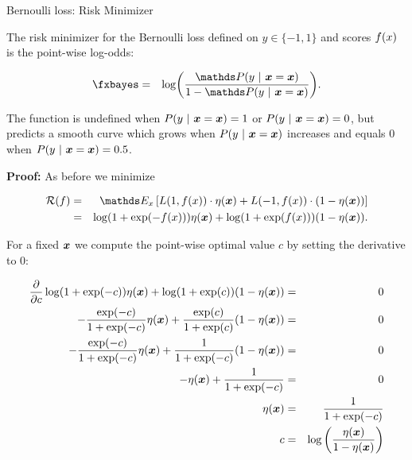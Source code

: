 \begin{vbframe}{Bernoulli loss: Risk Minimizer}
\begin{footnotesize}
\end{footnotesize}

\framebreak 

The risk minimizer for the Bernoulli loss defined on $y \in \{-1, 1\}$ and scores $f(x)$ is the point-wise log-odds:

\begin{eqnarray*}
\fxbayes &=&  \log \biggl(\frac{\P(y~|~\xv = \xv)}{1-\P(y~|~\xv = \xv)}\biggr).
\end{eqnarray*}

The function is undefined when $P(y~|~\bm{x} = \bm{x}) = 1$ or $P(y~|~\bm{x} = \bm{x}) = 0$, but predicts a smooth curve which grows when $P(y~|~\bm{x} = \bm{x})$ increases and equals $0$ when $P(y~|~\bm{x} = \bm{x}) = 0.5$.

\lz 

\textbf{Proof: } As before we minimize 

\begin{eqnarray*}
  \riskf &=& \E_x \left[L(1, \fx) \cdot \eta(\xv) + L(-1, \fx) \cdot (1 - \eta(\xv)) \right] \\
  &=&  \log(1 + \exp(- \fx)) \eta(\xv)+ \log(1 + \exp(\fx)) (1 - \eta(\xv)). 
\end{eqnarray*}

\framebreak 

For a fixed $\bm{x}$ we compute the point-wise optimal value $c$ by setting the derivative to $0$: 


\begin{footnotesize}
  \begin{eqnarray*}
  \frac{\partial }{\partial c} \log(1 + \exp(-c)) \eta(\bm{x})+ \log(1 + \exp(c)) (1 - \eta(\bm{x})) &=& 0 \\
  - \frac{\exp(-c)}{1 + \exp(-c)} \eta(\bm{x}) + \frac{\exp(c)}{1 + \exp(c)} (1 - \eta(\bm{x})) &=& 0 \\ 
   - \frac{\exp(-c)}{1 + \exp(-c)} \eta(\bm{x}) + \frac{1}{1 + \exp(- c)} (1 - \eta(\bm{x})) &=& 0\\ 
  - \eta(\bm{x}) + \frac{1}{1 + \exp(-c)} &=& 0\\
  \eta(\bm{x}) &=& \frac{1}{1 + \exp(-c)} \\
   c &=& \log\left(\frac{\eta(\bm{x})}{1 - \eta(\bm{x})}\right)
  \end{eqnarray*}
\end{footnotesize}

\end{vbframe}



